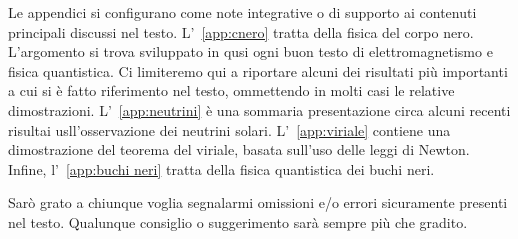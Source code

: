 Le appendici si configurano come note integrative o di supporto ai contenuti
principali discussi nel testo.  L'\appendixname~\ref{app:cnero} tratta della
fisica del corpo nero. L'argomento si trova sviluppato in qusi ogni buon testo
di elettromagnetismo e fisica quantistica. Ci limiteremo qui a riportare alcuni
dei risultati pi\`u importanti a cui si \`e fatto riferimento nel testo,
ommettendo in molti casi le relative dimostrazioni.
L'\appendixname~\ref{app:neutrini} \`e una sommaria presentazione circa alcuni
recenti risultai usll'osservazione dei neutrini solari.
L'\appendixname~\ref{app:viriale} contiene una dimostrazione del teorema del
viriale, basata sull'uso delle leggi di Newton.  Infine,
l'\appendixname~\ref{app:buchi neri} tratta della fisica quantistica dei buchi
neri.

Sar\`o grato a chiunque voglia segnalarmi omissioni e/o errori sicuramente
presenti nel testo.  Qualunque consiglio o suggerimento sar\`a sempre pi\`u che
gradito.

\bigskip
 
\noindent\textsw{\myLocation, \myTime}

\begin{flushright}
        \Large{\calligra\myName} 
\end{flushright}

